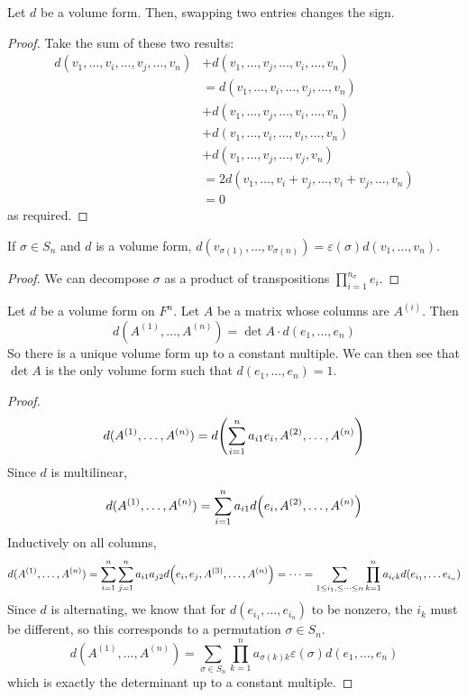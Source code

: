 \begin{lemma}
	Let \( d \) be a volume form.
	Then, swapping two entries changes the sign.
\end{lemma}
\begin{proof}
	Take the sum of these two results:
	\begin{align*}
		d(v_1, \dots, v_i, \dots, v_j, \dots, v_n) & + d(v_1, \dots, v_j, \dots, v_i, \dots, v_n)               \\
		                                           & = d(v_1, \dots, v_i, \dots, v_j, \dots, v_n)               \\
		                                           & + d(v_1, \dots, v_j, \dots, v_i, \dots, v_n)               \\
		                                           & + d(v_1, \dots, v_i, \dots, v_i, \dots, v_n)               \\
		                                           & + d(v_1, \dots, v_j, \dots, v_j, v_n)                      \\
		                                           & = 2 d(v_1, \dots, v_i + v_j, \dots, v_i + v_j, \dots, v_n) \\
		                                           & = 0
	\end{align*}
	as required.
\end{proof}
\begin{corollary}
	If \( \sigma \in S_n \) and \( d \) is a volume form, \( d(v_{\sigma(1)}, \dots, v_{\sigma(n)}) = \varepsilon(\sigma) d(v_1, \dots, v_n) \).
\end{corollary}
\begin{proof}
	We can decompose \( \sigma \) as a product of transpositions \( \prod_{i=1}^{n_\sigma} e_i \).
\end{proof}
\begin{theorem}
	Let \( d \) be a volume form on \( F^n \).
	Let \( A \) be a matrix whose columns are \( A^{(i)} \).
	Then
	\[
		d(A^{(1)}, \dots, A^{(n)}) = \det A \cdot d(e_1, \dots, e_n)
	\]
	So there is a unique volume form up to a constant multiple.
	We can then see that \( \det A \) is the only volume form such that \( d(e_1, \dots, e_n) = 1 \).
\end{theorem}
\begin{proof}
	\[
		d(A^{(1)}, \dots, A^{(n)}) = d\qty(\sum_{i=1}^n a_{i1} e_i, A^{(2)}, \dots, A^{(n)})
	\]
	Since \( d \) is multilinear,
	\[
		d(A^{(1)}, \dots, A^{(n)}) = \sum_{i=1}^n a_{i1} d\qty(e_i, A^{(2)}, \dots, A^{(n)})
	\]
	Inductively on all columns,
	\[
		d(A^{(1)}, \dots, A^{(n)}) = \sum_{i=1}^n \sum_{j=1}^n a_{i1} a_{j2} d\qty(e_i, e_j, A^{(3)}, \dots, A^{(n)}) = \dots = \sum_{1 \leq i_1, \leq \dots \leq n} \prod_{k=1}^n a_{i_\ell k} d(e_{i_1}, \dots e_{i_n})
	\]
	Since \( d \) is alternating, we know that for \( d(e_{i_1}, \dots, e_{i_n}) \) to be nonzero, the \( i_k \) must be different, so this corresponds to a permutation \( \sigma \in S_n \).
	\[
		d(A^{(1)}, \dots, A^{(n)}) = \sum_{\sigma \in S_n} \prod_{k=1}^n a_{\sigma(k) k} \varepsilon(\sigma) d(e_1, \dots, e_n)
	\]
	which is exactly the determinant up to a constant multiple.
\end{proof}


